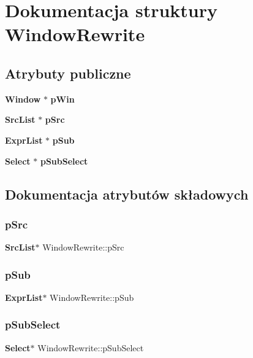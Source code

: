 \section{Dokumentacja struktury Window\+Rewrite}
\label{struct_window_rewrite}
\subsection*{Atrybuty publiczne}
\begin{DoxyCompactItemize}
\item 
\textbf{ Window} $\ast$ \textbf{ p\+Win}
\item 
\textbf{ Src\+List} $\ast$ \textbf{ p\+Src}
\item 
\textbf{ Expr\+List} $\ast$ \textbf{ p\+Sub}
\item 
\textbf{ Select} $\ast$ \textbf{ p\+Sub\+Select}
\end{DoxyCompactItemize}


\subsection{Dokumentacja atrybutów składowych}
\mbox{\label{struct_window_rewrite_a7c3f1a3485f37a65bf232ac0d9443f2e}} 
\subsubsection{pSrc}
{\footnotesize\ttfamily \textbf{ Src\+List}$\ast$ Window\+Rewrite\+::p\+Src}

\mbox{\label{struct_window_rewrite_a4c8e30eec6912a56128646b5cdbad715}} 
\subsubsection{pSub}
{\footnotesize\ttfamily \textbf{ Expr\+List}$\ast$ Window\+Rewrite\+::p\+Sub}

\mbox{\label{struct_window_rewrite_a49d7114e9421cdad9fe31ba24be67896}} 
\subsubsection{pSubSelect}
{\footnotesize\ttfamily \textbf{ Select}$\ast$ Window\+Rewrite\+::p\+Sub\+Select}

